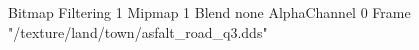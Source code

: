 {Bitmap
	{Filtering 1}
	{Mipmap 1}
	{Blend none}
	{AlphaChannel 0}
	{Frame "/texture/land/town/asfalt_road_q3.dds"}
}
